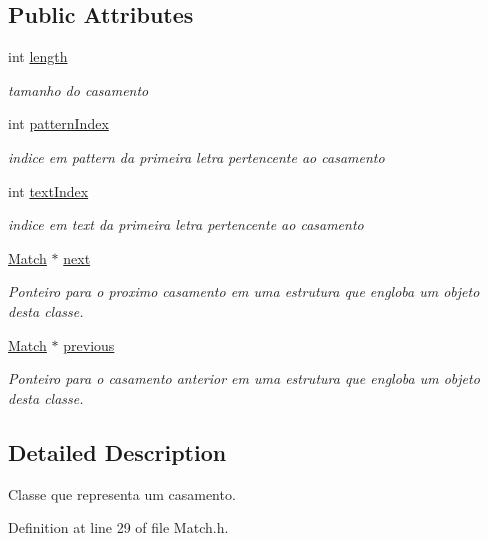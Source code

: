 \subsection*{Public Attributes}
\begin{DoxyCompactItemize}
\item 
int \hyperlink{classMatch_aa7e6b74eb7831de7a921ef7d3655d19a}{length}
\begin{DoxyCompactList}\small\item\em tamanho do casamento \end{DoxyCompactList}\item 
int \hyperlink{classMatch_ac673bad1075e5499f0d857ed0a526fa2}{pattern\+Index}
\begin{DoxyCompactList}\small\item\em indice em pattern da primeira letra pertencente ao casamento \end{DoxyCompactList}\item 
int \hyperlink{classMatch_aee534a2e3d23f7d069a618e1cb7b6343}{text\+Index}
\begin{DoxyCompactList}\small\item\em indice em text da primeira letra pertencente ao casamento \end{DoxyCompactList}\item 
\hyperlink{classMatch}{Match} $\ast$ \hyperlink{classMatch_a992c150265becb5f6806d09bad8cea0c}{next}
\begin{DoxyCompactList}\small\item\em Ponteiro para o proximo casamento em uma estrutura que engloba um objeto desta classe. \end{DoxyCompactList}\item 
\hyperlink{classMatch}{Match} $\ast$ \hyperlink{classMatch_aec1e648b8eba83f2ed76182644ce91de}{previous}
\begin{DoxyCompactList}\small\item\em Ponteiro para o casamento anterior em uma estrutura que engloba um objeto desta classe. \end{DoxyCompactList}\end{DoxyCompactItemize}


\subsection{Detailed Description}
Classe que representa um casamento. 

Definition at line 29 of file Match.\+h.



